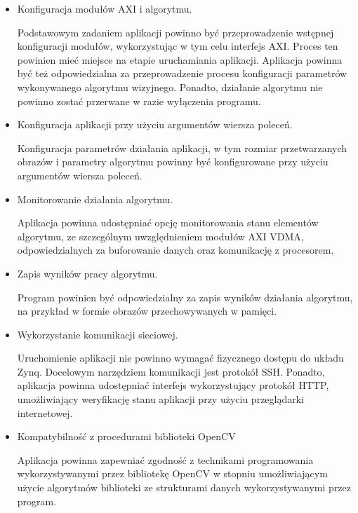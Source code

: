 \begin{itemize}

	\item Konfiguracja modułów AXI i algorytmu.
	
	Podstawowym zadaniem aplikacji powinno być przeprowadzenie wstępnej konfiguracji modułów, wykorzystując w tym celu interfejs AXI. 
	Proces ten powinien mieć miejsce na etapie uruchamiania aplikacji. 
	Aplikacja powinna być też odpowiedzialna za przeprowadzenie procesu konfiguracji parametrów wykonywanego algorytmu wizyjnego.	
	Ponadto, działanie algorytmu nie powinno zostać przerwane w razie wyłączenia programu.
	
	\item Konfiguracja aplikacji przy użyciu argumentów wiersza poleceń.
	
	Konfiguracja parametrów działania aplikacji, w tym rozmiar przetwarzanych obrazów i parametry algorytmu powinny być konfigurowane przy użyciu argumentów wiersza poleceń.
	
	\item Monitorowanie działania algorytmu.
	
	Aplikacja powinna udostępniać opcję monitorowania stanu elementów algorytmu, ze szczególnym uwzględnieniem modułów AXI VDMA, odpowiedzialnych za buforowanie danych oraz komunikację z procesorem.
	
	\item Zapis wyników pracy algorytmu.
	
	Program powinien być odpowiedzialny za zapis wyników działania algorytmu, na przykład w formie obrazów przechowywanych w pamięci.
	
	\item Wykorzystanie komunikacji sieciowej.
	
	Uruchomienie aplikacji nie powinno wymagać fizycznego dostępu do układu Zynq. 
	Docelowym narzędziem komunikacji jest protokół SSH. 
	Ponadto, aplikacja powinna udostępniać interfejs wykorzystujący protokół HTTP, umożliwiający weryfikację stanu aplikacji przy użyciu przeglądarki internetowej.
	
	\item Kompatybilność z procedurami biblioteki OpenCV
	
	Aplikacja powinna zapewniać zgodność z technikami programowania wykorzystywanymi przez bibliotekę OpenCV w stopniu umożliwiającym użycie algorytmów biblioteki ze strukturami danych wykorzystywanymi przez program.
\end{itemize}

